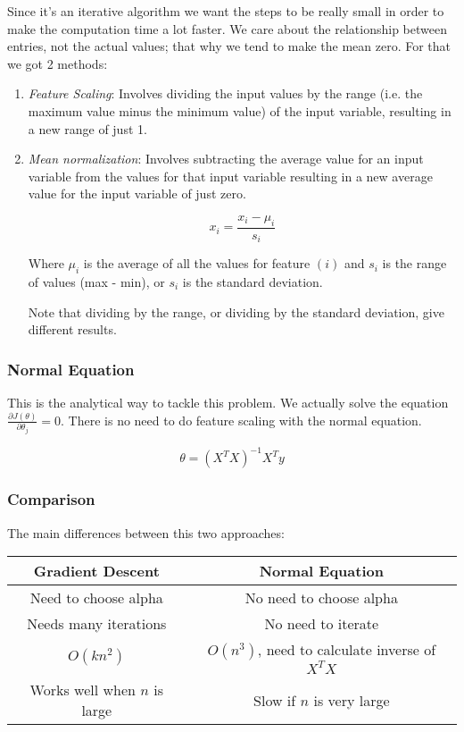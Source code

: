 Since it's an iterative algorithm we want the steps to be really small in order to make the computation time a lot faster. We care about the relationship between entries, not the actual values; that why we tend to make the mean zero. For that we got 2 methods:

\begin{enumerate}[label=\arabic*.]
\item 
	\textit{Feature Scaling}: Involves dividing the input values by the range (i.e. the maximum value minus the minimum value) of the input variable, resulting in a new range of just 1.

\item 
	\textit{Mean normalization}: Involves subtracting the average value for an input variable from the values for that input variable resulting in a new average value for the input variable of just zero.

	$$x_i = \frac{x_i - \mu_i}{s_i}$$

	Where $\mu_i$ is the average of all the values for feature $(i)$ and $s_i$ is the range of values (max - min), or $s_i$ is the standard deviation.

	Note that dividing by the range, or dividing by the standard deviation, give different results. 
\end{enumerate}

\subsubsection{Normal Equation}
This is the analytical way to tackle this problem. We actually solve the equation $\frac{\partial{J(\theta)}}{\partial{\theta_{j}}} = 0$. There is no need to do feature scaling with the normal equation.

$$\theta = (X^TX)^{-1}X^Ty$$


\subsubsection{Comparison}
The main differences between this two approaches:


\begin{center}
\begin{tabular}{ |c|c| } 
\hline
\textbf{Gradient Descent} & \textbf{Normal Equation} \\
\hline
Need to choose alpha & No need to choose alpha \\
\hline
Needs many iterations & No need to iterate \\
\hline
$O(kn^2)$ & $O(n^3)$, need to calculate inverse of $X^TX$ \\
\hline
Works well when $n$ is large & Slow if $n$ is very large \\
\hline
\end{tabular}
\end{center}

